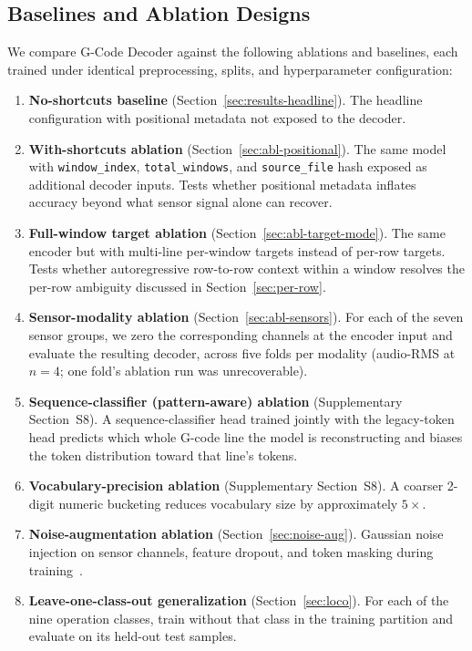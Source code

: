 \documentclass[sensors,article,submit,moreauthors,pdftex]{Definitions/mdpi}
\newcommand{\modelname}{G-Code Decoder}
\begin{document}
\subsection{Baselines and Ablation Designs}
\label{sec:ablations-design}

We compare \modelname{} against the following ablations and baselines, each trained under identical preprocessing, splits, and hyperparameter configuration:

\begin{enumerate}
\item \textbf{No-shortcuts baseline} (Section~\ref{sec:results-headline}). The headline configuration with positional metadata not exposed to the decoder.
\item \textbf{With-shortcuts ablation} (Section~\ref{sec:abl-positional}). The same model with \texttt{window\_index}, \texttt{total\_windows}, and \texttt{source\_file} hash exposed as additional decoder inputs. Tests whether positional metadata inflates accuracy beyond what sensor signal alone can recover.
\item \textbf{Full-window target ablation} (Section~\ref{sec:abl-target-mode}). The same encoder but with multi-line per-window targets instead of per-row targets. Tests whether autoregressive row-to-row context within a window resolves the per-row ambiguity discussed in Section~\ref{sec:per-row}.
\item \textbf{Sensor-modality ablation} (Section~\ref{sec:abl-sensors}). For each of the seven sensor groups, we zero the corresponding channels at the encoder input and evaluate the resulting decoder, across five folds per modality (audio-RMS at $n=4$; one fold's ablation run was unrecoverable).
\item \textbf{Sequence-classifier (pattern-aware) ablation} (Supplementary Section~S8). A sequence-classifier head trained jointly with the legacy-token head predicts which whole G-code line the model is reconstructing and biases the token distribution toward that line's tokens.
\item \textbf{Vocabulary-precision ablation} (Supplementary Section~S8). A coarser 2-digit numeric bucketing reduces vocabulary size by approximately $5\times$.
\item \textbf{Noise-augmentation ablation} (Section~\ref{sec:noise-aug}). Gaussian noise injection on sensor channels, feature dropout, and token masking during training~\cite{srivastava2014dropout,jia2016deep,meyes2019ablation}.
\item \textbf{Leave-one-class-out generalization} (Section~\ref{sec:loco}). For each of the nine operation classes, train without that class in the training partition and evaluate on its held-out test samples.
\end{enumerate}
\end{document}
